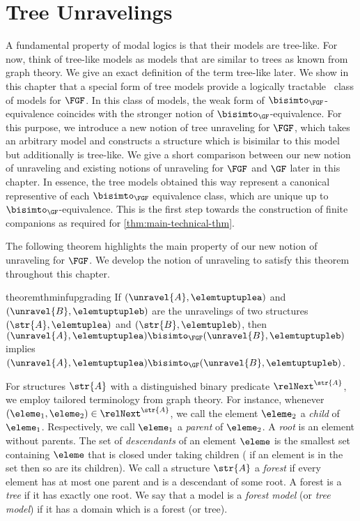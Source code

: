 \chapter{Tree Unravelings}\label{chap:unraveling}
A fundamental property of modal logics is that their models are tree-like.
For now, think of tree-like models as models that are similar to trees as known from graph theory.
We give an exact definition of the term tree-like later.
We show in this chapter that a special form of tree models provide a logically tractable~\cite{otto2013} class of models for $\FGF$.
In this class of models, the weak form of $\bisimto_{\FGF}$-equivalence coincides with the stronger notion of $\bisimto_{\GF}$-equivalence.
For this purpose, we introduce a new notion of tree unraveling for $\FGF$, which takes an arbitrary model and constructs a structure which is bisimilar to this model but additionally is tree-like.
We give a short comparison between our new notion of unraveling and existing notions of unraveling for $\FGF$ and $\GF$ later in this chapter.
In essence, the tree models obtained this way represent a canonical representive of each $\bisimto_{\FGF}$ equivalence class, which are unique up to $\bisimto_{\GF}$-equivalence.
This is the first step towards the construction of finite companions as required for \cref{thm:main-technical-thm}.

The following theorem highlights the main property of our new notion of unraveling for $\FGF$.
We develop the notion of unraveling to satisfy this theorem throughout this chapter.
\begin{restatable}{theorem}{thminfupgrading}\label{thm:inf-bisim-upgrading}
  If $(\unravel{A}, \elemtuptuplea)$ and $(\unravel{B}, \elemtuptupleb)$ are the unravelings of two structures $(\str{A}, \elemtuplea)$ and $(\str{B}, \elemtupleb)$, then $(\unravel{A}, \elemtuptuplea) \bisimto_{\FGF} (\unravel{B}, \elemtuptupleb)$ implies $(\unravel{A}, \elemtuptuplea) \bisimto_{\GF} (\unravel{B}, \elemtuptupleb)$.
\end{restatable}%

\noindent
For structures $\str{A}$ with a distinguished binary predicate $\relNext^{\str{A}}$, we employ tailored terminology from graph theory.
For instance, whenever $(\eleme_1, \eleme_2) \in \relNext^{\str{A}}$, we call the element $\eleme_2$ a \emph{child} of $\eleme_1$. Respectively, we call $\eleme_1$ a \emph{parent} of $\eleme_2$.
A \emph{root} is an element without parents.
The set of \emph{descendants} of an element $\eleme$ is the smallest set containing $\eleme$ that is closed under taking children (\ie{} if an element is in the set then so are its children).
We call a structure $\str{A}$ a \emph{forest} if every element has at most one parent and is a descendant of some root.
A forest is a \emph{tree} if it has exactly one root.
We say that a model is a \emph{forest model} (or \emph{tree model}) if it has a domain which is a forest (or tree).

